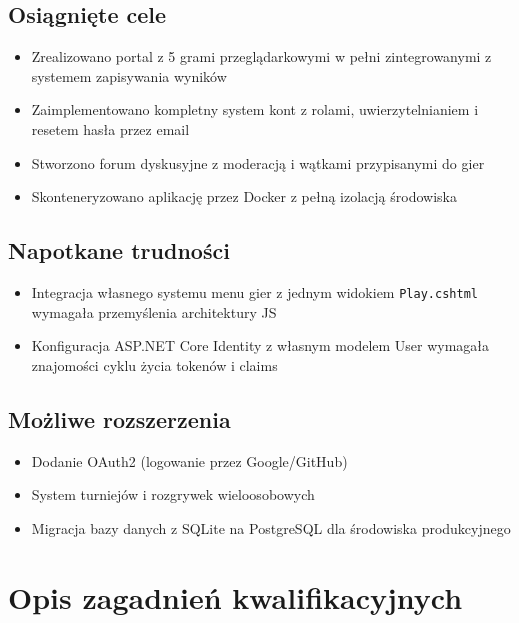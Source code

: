 \documentclass[12pt,a4paper]{article}
\newcommand{\code}[1]{\texttt{\small#1}}
\begin{document}
\subsection{Osiągnięte cele}

\begin{itemize}[leftmargin=1.5cm]
  \item Zrealizowano portal z 5 grami przeglądarkowymi w pełni zintegrowanymi z systemem zapisywania wyników
  \item Zaimplementowano kompletny system kont z rolami, uwierzytelnianiem i resetem hasła przez email
  \item Stworzono forum dyskusyjne z moderacją i wątkami przypisanymi do gier
  \item Skonteneryzowano aplikację przez Docker z pełną izolacją środowiska
\end{itemize}

\subsection{Napotkane trudności}

\begin{itemize}[leftmargin=1.5cm]
  \item Integracja własnego systemu menu gier z jednym widokiem \code{Play.cshtml} wymagała przemyślenia architektury JS
  \item Konfiguracja ASP.NET Core Identity z własnym modelem User wymagała znajomości cyklu życia tokenów i claims
\end{itemize}

\subsection{Możliwe rozszerzenia}

\begin{itemize}[leftmargin=1.5cm]
  \item Dodanie OAuth2 (logowanie przez Google/GitHub)
  \item System turniejów i rozgrywek wieloosobowych
  \item Migracja bazy danych z SQLite na PostgreSQL dla środowiska produkcyjnego
\end{itemize}

\newpage
\section*{Opis zagadnień kwalifikacyjnych}
\end{document}

